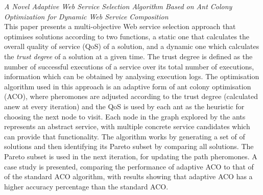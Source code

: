 \textit{A Novel Adaptive Web Service Selection Algorithm Based on Ant Colony Optimization for Dynamic Web Service Composition \cite{wang2014novel}}\\
This paper presents a multi-objective Web service selection approach that optimises solutions according to two functions, a static one that calculates the overall quality of service (QoS) of a solution, and a dynamic one which calculates the \textit{trust degree} of a solution at a given time. The trust degree is defined as the number of successful executions of a service over its total number of executions, information which can be obtained by analysing execution logs. The optimisation algorithm used in this approach is an adaptive form of ant colony optimisation (ACO), where pheromones are adjusted according to the trust degree (calculated anew at every iteration) and the QoS is used by each ant as the heuristic for choosing the next node to visit. Each node in the graph explored by the ants represents an abstract service, with multiple concrete service candidates which can provide that functionality. The algorithm works by generating a set of of solutions and then identifying its Pareto subset by comparing all solutions. The Pareto subset is used in the next iteration, for updating the path pheromones. A case study is presented, comparing the performance of adaptive ACO to that of of the standard ACO algorithm, with results showing that adaptive ACO has a higher accuracy percentage than the standard ACO.

